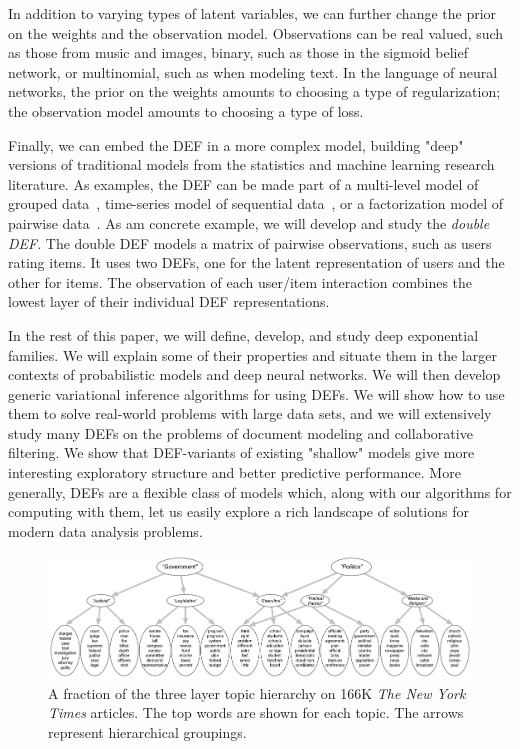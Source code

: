 \documentclass[twoside]{article}
\begin{document}
In addition to varying types of latent variables, we can further change the
prior on the weights and the observation model. Observations can be real valued, such as those
from music and images, binary, such as those
in the sigmoid belief network, or multinomial, such as
when modeling text. In the language of
neural networks, the prior on the weights amounts to choosing a type
of regularization; the observation model amounts to choosing a type of
loss. 

Finally, we can embed the DEF in a more complex model, building "deep"
versions of traditional models from the statistics and machine
learning research literature.
As examples, the DEF can be made part of a
multi-level model of grouped data~\cite{Gelman:2007}, time-series
model of sequential data~\cite{Blei:2006d}, or a factorization model of pairwise
data~\cite{Salakhutdinov:2008}. 
As am concrete example, we will develop and study the \textit{double
DEF}.  The double DEF models a matrix of pairwise observations, such
as users rating items.  It uses two DEFs, one for the latent
representation of users and the other for items.  The observation of each
user/item interaction combines the lowest layer of their individual
DEF representations.


In the rest of this paper, we will define, develop, and study deep
exponential families.  We will explain some of their properties and
situate them in the larger contexts of probabilistic models and deep
neural networks.  We will then develop generic variational inference
algorithms for using DEFs. We will
show how to use them to solve real-world problems with large data
sets, and we will extensively study many DEFs on the problems of
document modeling and collaborative filtering.  We show that
DEF-variants of existing "shallow" models give more interesting
exploratory structure and better predictive performance.  More
generally, DEFs are a flexible class of models which, along with our
algorithms for computing with them, let us easily explore a rich
landscape of solutions for modern data analysis problems.

\begin{figure}
	\centering
	    \includegraphics[width=\textwidth]{../fig/pdf/nyt-government-politics.pdf}
	\caption{A fraction of the three layer topic hierarchy on 166K \emph{The New York Times} articles. 
				The top words are shown for each topic.
	   			The arrows represent hierarchical groupings.}
	\label{fig:nyt_topics}
\end{figure}
\end{document}
